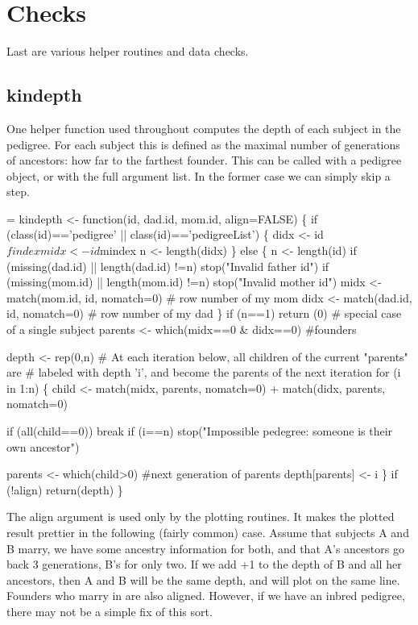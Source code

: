 \documentclass{article}
\begin{document}
\section{Checks}
Last are various helper routines and data checks.
\subsection{kindepth}
One helper function used throughout computes the depth of
each subject in the pedigree.  
For each subject this is defined as the maximal number of
generations of ancestors: how far to the farthest
founder.  
This can be called with a pedigree object, or with the 
full argument list.  In the former case we can simply
skip a step.
\begin{nwchunk}
=
 kindepth <- function(id, dad.id, mom.id, align=FALSE) \{
     if (class(id)=='pedigree' || class(id)=='pedigreeList') \{
         didx <- id$findex
         midx <- id$mindex
         n <- length(didx)
         \} 
     else \{
         n <- length(id)
         if (missing(dad.id) || length(dad.id) !=n)
             stop("Invalid father id")
         if (missing(mom.id) || length(mom.id) !=n)
             stop("Invalid mother id")
         midx <- match(mom.id, id, nomatch=0) # row number of my mom
         didx <- match(dad.id, id, nomatch=0) # row number of my dad
         \}
     if (n==1) return (0)  # special case of a single subject 
     parents <- which(midx==0 & didx==0)  #founders
 
     depth <- rep(0,n)
     # At each iteration below, all children of the current "parents" are
     #    labeled with depth 'i', and become the parents of the next iteration
     for (i in 1:n) \{
         child  <- match(midx, parents, nomatch=0) +
                   match(didx, parents, nomatch=0)
 
         if (all(child==0)) break
         if (i==n) 
             stop("Impossible pedegree: someone is their own ancestor")
 
         parents <- which(child>0) #next generation of parents
         depth[parents] <- i
         \}
     if (!align) return(depth)
 \}
\end{nwchunk}

The align argument is used only by the plotting routines.  
It makes the plotted result prettier in the following (fairly common)
case. 
Assume that subjects A and B marry, we have some ancestry information for
both, and that A's ancestors go back 3 generations, B's for only two.
If we add +1 to the depth of B and all her ancestors, then A and B
will be the same depth, and will plot on the same line.
Founders who marry in are also aligned.
However, if we have an inbred pedigree, there may not be a simple fix
of this sort.
\end{document}
